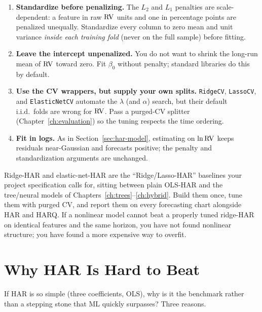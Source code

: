 \begin{keyidea}
\begin{enumerate}[nosep]
  \item \textbf{Standardize before penalizing.} The $L_2$ and $L_1$ penalties are scale-dependent: a feature in raw $\operatorname{RV}$ units and one in percentage points are penalized unequally. Standardize every column to zero mean and unit variance \emph{inside each training fold} (never on the full sample) before fitting.
  \item \textbf{Leave the intercept unpenalized.} You do not want to shrink the long-run mean of $\operatorname{RV}$ toward zero. Fit $\beta_0$ without penalty; standard libraries do this by default.
  \item \textbf{Use the CV wrappers, but supply your own splits.} \texttt{RidgeCV}, \texttt{LassoCV}, and \texttt{ElasticNetCV} automate the $\lambda$ (and $\alpha$) search, but their default i.i.d.\ folds are wrong for $\operatorname{RV}$. Pass a purged-CV splitter (Chapter~\ref{ch:evaluation}) so the tuning respects the time ordering.
  \item \textbf{Fit in logs.} As in Section~\ref{sec:har-model}, estimating on $\ln\operatorname{RV}$ keeps residuals near-Gaussian and forecasts positive; the penalty and standardization arguments are unchanged.
\end{enumerate}
\end{keyidea}

\begin{projectconnection}
Ridge-HAR and elastic-net-HAR are the ``Ridge/Lasso-HAR'' baselines your project specification calls for, sitting between plain OLS-HAR and the tree/neural models of Chapters~\ref{ch:trees}--\ref{ch:hybrid}.
Build them once, tune them with purged CV, and report them on every forecasting chart alongside HAR and HARQ.
If a nonlinear model cannot beat a properly tuned ridge-HAR on identical features and the same horizon, you have not found nonlinear structure; you have found a more expensive way to overfit.
\end{projectconnection}


\section{Why HAR Is Hard to Beat}
\label{sec:har-hard-to-beat}

If HAR is so simple (three coefficients, OLS), why is it the benchmark rather than a stepping stone that ML quickly surpasses?
Three reasons.

